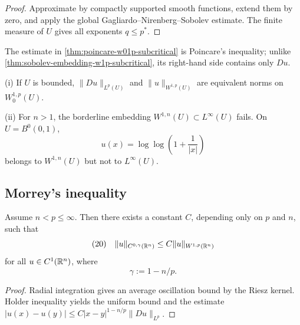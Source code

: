 \begin{proof}
\sketch Approximate by compactly supported smooth functions, extend them by zero, and apply the global Gagliardo--Nirenberg--Sobolev estimate. The finite measure of $U$ gives all exponents $q\le p^*$.
\end{proof}

\begin{remark}
\label{rem:poincare-w01p-terminology}

The estimate in \cref{thm:poincare-w01p-subcritical} is Poincare's inequality; unlike \cref{thm:sobolev-embedding-w1p-subcritical}, its right-hand side contains only $Du$.
\end{remark}

\begin{remark}[Equivalent norm on $W_0^{1,p}$; the borderline case $p=n$]
\label{rem:borderline-case-p-equals-n}

(i) If $U$ is bounded, $\|Du\|_{L^p(U)}$ and $\|u\|_{W^{1,p}(U)}$ are equivalent norms on $W_0^{1,p}(U)$.

(ii) For $n>1$, the borderline embedding $W^{1,n}(U)\subset L^\infty(U)$ fails. On $U=B^0(0,1)$,
$$u(x)=\log\log\left(1+\frac{1}{|x|}\right)$$
belongs to $W^{1,n}(U)$ but not to $L^\infty(U)$.
\end{remark}

\subsection{Morrey's inequality}

\begin{theorem}
\label{thm:morreys-inequality}

Assume $n < p \le \infty$. Then there exists a constant $C$, depending only on $p$ and $n$, such that
$$(20) \quad \|u\|_{C^{0,\gamma}(\mathbb{R}^n)} \le C\|u\|_{W^{1,p}(\mathbb{R}^n)}$$
for all $u \in C^1(\mathbb{R}^n)$, where
$$\gamma := 1 - n/p.$$
\end{theorem}

\begin{proof}
\sketch Radial integration gives an average oscillation bound by the Riesz kernel. Holder inequality yields the uniform bound and the estimate $|u(x)-u(y)|\le C|x-y|^{1-n/p}\|Du\|_{L^p}$.
\end{proof}

